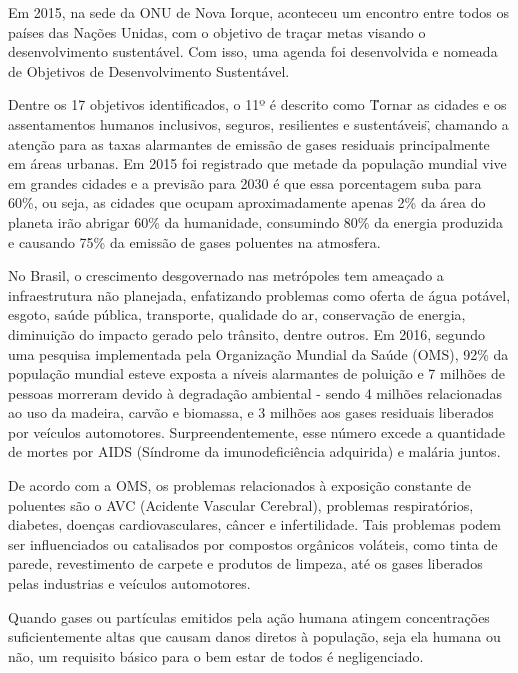 
Em 2015, na sede da ONU de Nova Iorque, aconteceu um encontro entre todos 
os países das Nações Unidas, com o objetivo de traçar metas visando o 
desenvolvimento sustentável. Com isso, uma agenda foi desenvolvida e nomeada 
de Objetivos de Desenvolvimento Sustentável. 

Dentre os 17 objetivos identificados, o 11º é descrito como \"Tornar as cidades 
e os assentamentos humanos inclusivos, seguros, resilientes e sustentáveis\", 
chamando a atenção para as taxas alarmantes de emissão de gases residuais 
principalmente em áreas urbanas. Em 2015 foi registrado que metade da população 
mundial vive em grandes cidades e a previsão para 2030 é que essa porcentagem 
suba para 60\%, ou seja, as cidades que ocupam aproximadamente apenas 2\% da área 
do planeta irão abrigar 60\% da humanidade, consumindo 80\% da energia produzida 
e causando 75\% da emissão de gases poluentes na atmosfera. 

No Brasil, o crescimento desgovernado nas metrópoles tem ameaçado a infraestrutura 
não planejada, enfatizando problemas como oferta de água potável, esgoto, saúde 
pública, transporte, qualidade do ar, conservação de energia, diminuição do impacto 
gerado pelo trânsito, dentre outros. Em 2016, segundo uma pesquisa implementada 
pela Organização Mundial da Saúde (OMS), 92\% da população mundial esteve exposta a 
níveis alarmantes de poluição e 7  milhões de pessoas morreram devido à degradação 
ambiental - sendo 4 milhões relacionadas ao uso da madeira, carvão e biomassa, e 3 
milhões aos gases residuais liberados por veículos automotores. Surpreendentemente, 
esse número excede a quantidade de mortes por AIDS (Síndrome da imunodeficiência 
adquirida) e malária juntos.

De acordo com a OMS, os problemas relacionados à exposição constante de poluentes são 
o AVC (Acidente Vascular Cerebral), problemas respiratórios, diabetes, doenças 
cardiovasculares, câncer e infertilidade. Tais problemas podem ser influenciados ou 
catalisados por compostos orgânicos voláteis, como tinta de parede, revestimento de 
carpete e produtos de limpeza, até os gases liberados pelas industrias e veículos 
automotores.

Quando gases ou partículas emitidos pela ação humana atingem concentrações 
suficientemente altas que causam danos diretos à população, seja ela humana ou não, 
um requisito básico para o bem estar de todos é negligenciado.

